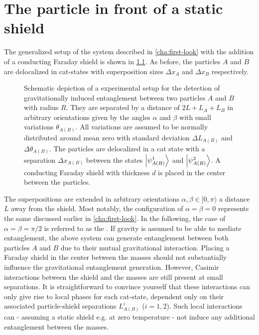 \chapter{The particle in front of a static shield}\label{cha:entanglement-generation}

The generalized setup of the system described in \cref{cha:first-look} with the addition of a conducting Faraday shield is shown in \cref{fig:4:complete-setup}. As before, the particles $A$ and $B$ are delocalized in cat-states with superposition sizes $\Delta x_A$ and $\Delta x_B$ respectively.
\begin{figure}[!htbp]
  \centering
  \def\svgwidth{\textwidth}
  
  \caption{Schematic depiction of a experimental setup for the detection of gravitationally induced entanglement between two particles $A$ and $B$ with radius $R$. They are separated by a distance of $2L + L_A + L_B$ in arbitrary orientations given by the angles $\alpha$ and $\beta$ with small variations $\theta_{A(B)}$. All variations are assumed to be normally distributed around mean zero with standard deviation $\Delta L_{A(B)}$ and $\Delta \theta_{A(B)}$. The particles are delocalized in a cat state with a separation $\Delta x_{A(B)}$ between the states $\ket{\psi_{A(B)}^1}$ and $\ket{\psi_{A(B)}^2}$. A conducting Faraday shield with thickness $d$ is placed in the center between the particles.}
  \label{fig:4:complete-setup}
\end{figure}
The superpositions are extended in arbitrary orientations $\alpha,\beta \in [0,\pi)$ a distance $L$ away from the shield. Most notably, the configuration of $\alpha = \beta = 0$ represents the same  discussed earlier in \cref{cha:first-look}. 
In the following, the case of $\alpha = \beta = \pi/2$ is referred to as the .
If gravity is assumed to be able to mediate entanglement, the above system can generate entanglement between both particles $A$ and $B$ due to their mutual gravitational interaction.
Placing a Faraday shield in the center between the masses should not substantially influence the gravitational entanglement generation.
However, Casimir interactions between the shield and the masses are still present at small separations.
It is straightforward to convince yourself that these interactions can only give rise to local phases for each cat-state, dependent only on their associated particle-shield separations $L^i_{A(B)}$ ($i = 1,2$).
Such local interactions can - assuming a static shield e.g. at zero temperature - not induce any additional entanglement between the masses.

